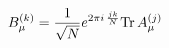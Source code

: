 \begin{equation}
B_\mu^{(k)}= \frac{1}{\sqrt N} e^{2 \pi i \, {jk \over N}} 
{\rm Tr}\, A_\mu^{(j)}
\end{equation}

